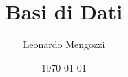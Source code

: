 \usepackage[italian]{babel}
\usepackage{listings}
\usepackage{xcolor}
\usepackage{fancyhdr}
\usepackage{float}
\usepackage{lastpage}
\usepackage[colorlinks=true, linkcolor=black]{hyperref}
\usepackage{tikz}			%
\usepackage{tikz-cd}
\usepackage{graphicx}
\usepackage{paracol}
\usepackage{multicol}
\usepackage[a4paper]{geometry}


\pagestyle{fancy}
\fancyhf{}
\fancyhead[C]{\leftmark}
\fancyhead[R]{\thepage/\pageref{LastPage}}

\title{Basi di Dati}
\author{Leonardo Mengozzi}
\date{\today}